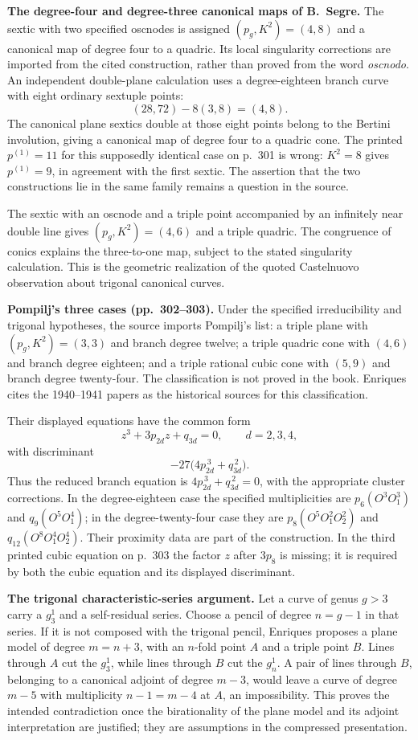\textbf{The degree-four and degree-three canonical maps of B.~Segre.}
The sextic with two specified oscnodes is assigned \((p_g,K^2)=(4,8)\) and a canonical map of degree four to a quadric. Its local singularity corrections are imported from the cited construction, rather than proved from the word \emph{oscnodo}. An independent double-plane calculation uses a degree-eighteen branch curve with eight ordinary sextuple points:
\[
(28,72)-8(3,8)=(4,8).
\]
The canonical plane sextics double at those eight points belong to the Bertini involution, giving a canonical map of degree four to a quadric cone. The printed \(p^{(1)}=11\) for this supposedly identical case on p.~301 is wrong: \(K^2=8\) gives \(p^{(1)}=9\), in agreement with the first sextic. The assertion that the two constructions lie in the same family remains a question in the source.

The sextic with an oscnode and a triple point accompanied by an infinitely near double line gives \((p_g,K^2)=(4,6)\) and a triple quadric. The congruence of conics explains the three-to-one map, subject to the stated singularity calculation. This is the geometric realization of the quoted Castelnuovo observation about trigonal canonical curves.

\textbf{Pompilj's three cases (pp.~302--303).}
Under the specified irreducibility and trigonal hypotheses, the source imports Pompilj's list: a triple plane with \((p_g,K^2)=(3,3)\) and branch degree twelve; a triple quadric cone with \((4,6)\) and branch degree eighteen; and a triple rational cubic cone with \((5,9)\) and branch degree twenty-four. The classification is not proved in the book. Enriques cites the 1940--1941 papers as the historical sources for this classification.

Their displayed equations have the common form
\[
z^3+3p_{2d}z+q_{3d}=0,\qquad d=2,3,4,
\]
with discriminant
\[
-27\bigl(4p_{2d}^{\,3}+q_{3d}^{\,2}\bigr).
\]
Thus the reduced branch equation is \(4p_{2d}^{\,3}+q_{3d}^{\,2}=0\), with the appropriate cluster corrections. In the degree-eighteen case the specified multiplicities are \(p_6(O^3O_1^3)\) and \(q_9(O^5O_1^4)\); in the degree-twenty-four case they are \(p_8(O^5O_1^2O_2^2)\) and \(q_{12}(O^8O_1^4O_2^4)\). Their proximity data are part of the construction. In the third printed cubic equation on p.~303 the factor \(z\) after \(3p_8\) is missing; it is required by both the cubic equation and its displayed discriminant.

\textbf{The trigonal characteristic-series argument.}
Let a curve of genus \(g>3\) carry a \(g^1_3\) and a self-residual series. Choose a pencil of degree \(n=g-1\) in that series. If it is not composed with the trigonal pencil, Enriques proposes a plane model of degree \(m=n+3\), with an \(n\)-fold point \(A\) and a triple point \(B\). Lines through \(A\) cut the \(g^1_3\), while lines through \(B\) cut the \(g^1_n\). A pair of lines through \(B\), belonging to a canonical adjoint of degree \(m-3\), would leave a curve of degree \(m-5\) with multiplicity \(n-1=m-4\) at \(A\), an impossibility. This proves the intended contradiction once the birationality of the plane model and its adjoint interpretation are justified; they are assumptions in the compressed presentation.

